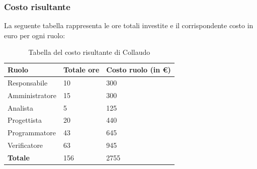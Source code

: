 




\subsubsection{Costo risultante}
La seguente tabella rappresenta le ore totali investite e il corrispondente costo in euro per ogni ruolo:
{
\renewcommand{\arraystretch}{2}
\begin{longtable}{ C{3cm} C{2cm} C{4cm}}
\caption{Tabella del costo risultante di Collaudo}\\
\rowcolor{\primaryColor}

\textcolor{\secondaryColor}{\textbf{Ruolo}} & 
\textcolor{\secondaryColor}{\textbf{Totale ore}} & 
\textcolor{\secondaryColor}{\textbf{Costo ruolo (in \euro{})}}\\	
\endhead
        
Responsabile    &  10 & 300 \\
Amministratore  &  15 & 300 \\
Analista        &  5 & 125 \\
Progettista     &  20 & 440 \\
Programmatore   &  43 & 645 \\
Verificatore    &  63 & 945 \\
\textbf{Totale} & 156 & 2755 \\
	
\end{longtable}
}

